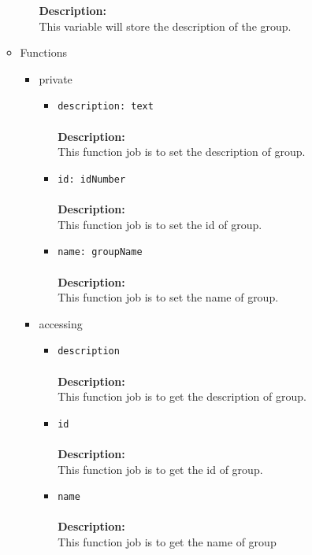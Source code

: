 \begin{itemize}
\begin{itemize}
\begin{itemize}
     \textbf{Description:}\\
     This variable will store the description of the group.
\end{itemize}


\item Functions
\label{sec-1-4-2-11-2}%
\begin{itemize}

\item private
\label{sec-1-4-2-11-2-1}%
\begin{itemize}
\item \verb~description: text~\\\\
\textbf{Description:}\\
      This function job is to set the description of group.\\
\item \verb~id: idNumber~\\\\
\textbf{Description:}\\
      This function job is to set the id of group.\\
\item \verb~name: groupName~\\\\
\textbf{Description:}\\
      This function job is to set the name of group.\\
\end{itemize}


\item accessing
\label{sec-1-4-2-11-2-2}%
\begin{itemize}
\item \verb~description~\\\\
\textbf{Description:}\\
      This function job is to get the description of group.\\
\item \verb~id~\\\\
\textbf{Description:}\\
      This function job is to get the id of group.\\
\item \verb~name~\\\\
\textbf{Description:}\\
      This function job is to get the name of group\\
\end{itemize}


\end{itemize}
\end{itemize}
\end{itemize}
